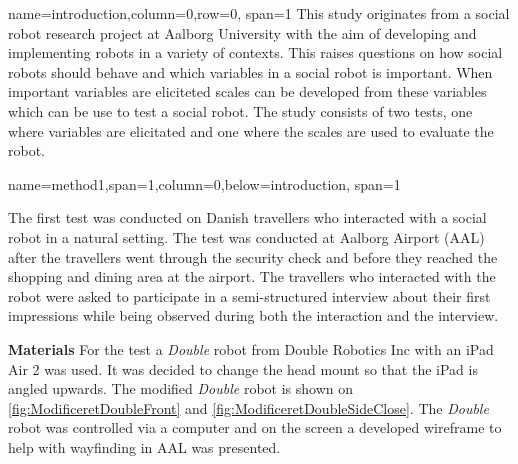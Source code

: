 \documentclass[paperwidth=160cm,paperheight=100cm,landscape,fontscale=0.2941]{baposter}
\begin{document}
\begin{poster}
{name=introduction,column=0,row=0, span=1}
{\parskip 5pt   
This study originates from a social robot research project at Aalborg University with the aim of developing and implementing robots in a variety of contexts. This raises questions on how social robots should behave and which variables in a social robot is important. When important variables are eliciteted scales can be developed from these variables which can be use to test a social robot. The study consists of two tests, one where variables are elicitated and one where the scales are used to evaluate the robot. 
}

{name=method1,span=1,column=0,below=introduction, span=1}
{\parskip 5pt 
The first test was conducted on Danish travellers who interacted with a social robot in a natural setting. The test was conducted at Aalborg Airport (AAL) after the travellers went through the security check and before they reached the shopping and dining area at the airport. The travellers who interacted with the robot were asked to participate in a semi-structured interview about their first impressions while being observed during both the interaction and the interview. 

\textbf{Materials}
For the test a \textit{Double} robot from Double Robotics Inc with an iPad Air 2 was used. It was decided to change the head mount so that the iPad is angled upwards. The modified \textit{Double} robot is shown on \autoref{fig:ModificeretDoubleFront} and \autoref{fig:ModificeretDoubleSideClose}. The \textit{Double} robot was controlled via a computer and on the screen a developed wireframe to help with wayfinding in AAL was presented. 
~





}
\end{poster}
\end{document}

